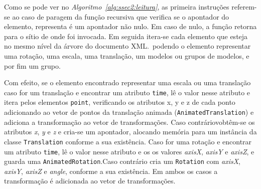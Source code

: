 \begin{algorithm}
\begin{algorithmic}[1]
\EndIf{}

 



\EndFor{}



 
\EndIf{}

\EndFor{}

\EndProcedure{}

\end{algorithmic}
\end{algorithm}

Como se pode ver no \emph{Algoritmo~\ref{alg:ssec2:leitura}}, as primeira
instruções referem-se ao caso de paragem da função recursiva que verifica se
o apontador do elemento, representa é um apontador não nulo. Em caso de nulo,
a função retorna para o sítio de onde foi invocada. 
Em seguida itera-se cada elemento que esteja no mesmo nível da árvore do
documento XML.\ podendo o elemento representar uma rotação, uma escala, uma
translação, um modelos ou grupos de modelos, e por fim um grupo.

Com efeito, se o elemento encontrado representar uma escala ou uma
translação caso for um translação e encontrar um atributo \texttt{time}, lê
o valor nesse atributo e itera pelos elementos \texttt{point}, verificando os
atributos x, y e z de cada ponto adicionando ao vetor de pontos da translação
animada (\texttt{AnimatedTranslation}) e adiciona a transformação ao vetor de
transformações. Caso contráriovobtêm-se os atributos \emph{x}, \emph{y} e \emph{z} e cria-se um
apontador, alocando memória para um instância da classe \texttt{Translation}
conforme a sua existência.
Caso for uma rotação e encontrar um atributo \texttt{time}, lê
o valor nesse atributo e os os valores \emph{axisX}, \emph{axisY}
e \emph{axisZ}, e guarda uma \texttt{AnimatedRotation}.Caso contrário
cria um  \texttt{Rotation} com \emph{axisX}, \emph{axisY}, \emph{axisZ}
e \emph{angle}, conforme a sua existência. Em ambos os casos a transformação
é adicionada ao vetor de transformações.


